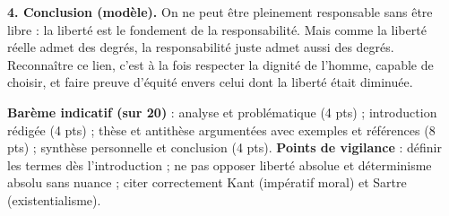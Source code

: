 \documentclass[11pt]{article}
\begin{document}
\begin{corrige}
\textbf{4. Conclusion (modèle).} On ne peut être pleinement responsable sans être libre : la liberté est le fondement de la responsabilité. Mais comme la liberté réelle admet des degrés, la responsabilité juste admet aussi des degrés. Reconnaître ce lien, c'est à la fois respecter la dignité de l'homme, capable de choisir, et faire preuve d'équité envers celui dont la liberté était diminuée.

\textbf{Barème indicatif (sur 20)} : analyse et problématique (4 pts) ; introduction rédigée (4 pts) ; thèse et antithèse argumentées avec exemples et références (8 pts) ; synthèse personnelle et conclusion (4 pts). \textbf{Points de vigilance} : définir les termes dès l'introduction ; ne pas opposer liberté absolue et déterminisme absolu sans nuance ; citer correctement Kant (impératif moral) et Sartre (existentialisme).
\end{corrige}
\end{document}
